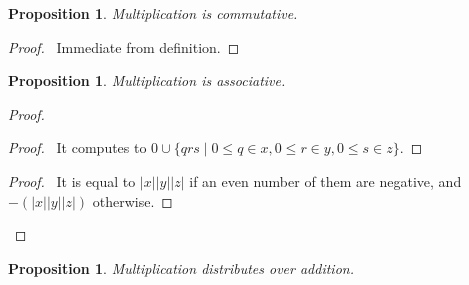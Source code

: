 \documentclass{book}
\let\qed\relax
\newtheorem{prop}[ax]{Proposition}
\theoremstyle{definition}
\begin{document}
\begin{prop}
Multiplication is commutative.
\end{prop}

\begin{proof}
\pf\ Immediate from definition. \qed
\end{proof}

\begin{prop}
Multiplication is associative.
\end{prop}

\begin{proof}
\pf
{}
\begin{proof}
	\pf\ It computes to $0 \cup \{qrs \mid 0 \leq q \in x, 0 \leq r \in y, 0 \leq s \in z\}$.
\end{proof}
\begin{proof}
	\pf\ It is equal to $|x||y||z|$ if an even number of them are negative, and $-(|x||y||z|)$ otherwise.
\end{proof}
\qed
\end{proof}

\begin{prop}
Multiplication distributes over addition.
\end{prop}
\end{document}
